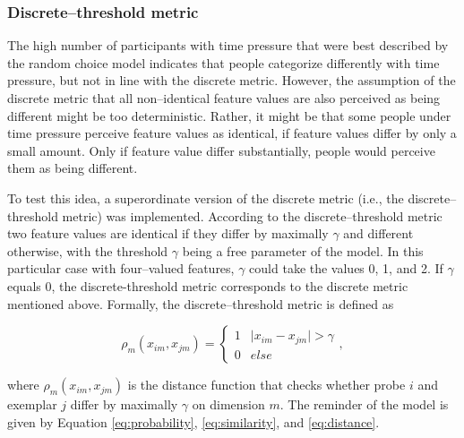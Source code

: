 \documentclass[a4paper,man,natbib]{apa6}
\begin{document}
\subsubsection{Discrete--threshold metric}
The high number of participants with time pressure that were best described by the random choice model indicates that people categorize differently with time pressure, but not in line with the discrete metric. However, the assumption of the discrete metric that all non--identical feature values are also perceived as being different might be too deterministic. Rather, it might be that some people under time pressure perceive feature values as identical, if feature values differ by only a small amount. Only if feature value differ substantially, people would perceive them as being different. 

To test this idea, a superordinate version of the discrete metric (i.e., the discrete--threshold metric) was implemented. According to the discrete--threshold metric two feature values are identical if they differ by maximally $\gamma$ and different otherwise, with the threshold $\gamma$ being a free parameter of the model. In this particular case with four--valued features, $\gamma$ could take the values 0, 1, and 2. If $\gamma$ equals 0, the discrete-threshold metric corresponds to the discrete metric mentioned above. Formally, the discrete--threshold metric is defined as

\begin{equation}
\rho_{m}(x_{im}, x_{jm}) = 
\begin{cases}
	1 & \mid x_{im} - x_{jm} \mid > \gamma \\
	0 & else 
\end{cases},
\end{equation}

where $\rho_{m}(x_{im}, x_{jm})$ is the distance function that checks whether probe $i$ and exemplar $j$ differ by maximally $\gamma$ on dimension $m$. The reminder of the model is given by Equation \ref{eq:probability}, \ref{eq:similarity}, and \ref{eq:distance}. 
\end{document}

